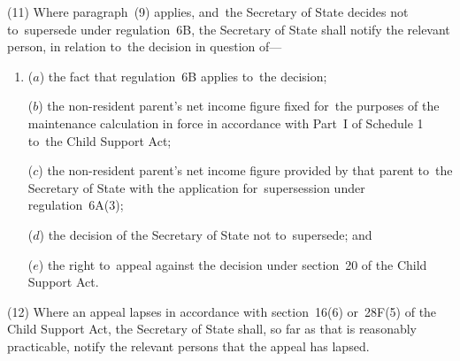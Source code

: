 \documentclass[12pt,a4paper]{article}
\begin{document}
(11) Where paragraph~(9) applies, and~the 
Secretary of State  %
decides not to~supersede under regulation~6B, 
the Secretary of State  %
shall notify the relevant person, in relation to~the decision in question of—
\begin{enumerate}\item[]
($a$) the fact that regulation~6B applies to~the decision;

($b$) the non-resident parent’s net income figure fixed for~the purposes of the maintenance calculation in force in accordance with Part~I of Schedule 1 to~the Child Support Act;

($c$) the non-resident parent’s net income figure provided by that parent to~the 
Secretary of State  %
with the application for~supersession under regulation~6A(3);

($d$) the decision of the 
Secretary of State  %
not to~supersede; and

($e$) the right to~appeal against the decision under section~20 of the Child Support Act.
\end{enumerate}

(12) Where an appeal lapses in accordance with section~16(6) or~28F(5) of the Child Support Act, the Secretary of State shall, so far as that is reasonably practicable, notify the relevant persons that the appeal has lapsed.

\end{document}
